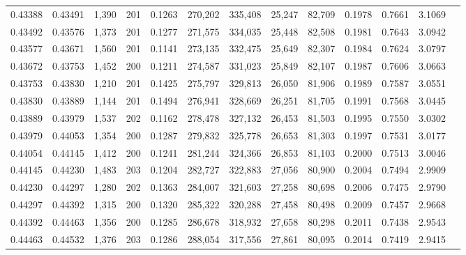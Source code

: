 \begin{tabular}{rrrrrrrrrrrrr}
0.43388 & 0.43491 & 1,390 & 201 &                                     0.1263 & 270,202 & 335,408 &  25,247 &  82,709 & 0.1978 & 0.7661 & 3.1069 \\
0.43492 & 0.43576 & 1,373 & 201 &                                     0.1277 & 271,575 & 334,035 &  25,448 &  82,508 & 0.1981 & 0.7643 & 3.0942 \\
0.43577 & 0.43671 & 1,560 & 201 &                                     0.1141 & 273,135 & 332,475 &  25,649 &  82,307 & 0.1984 & 0.7624 & 3.0797 \\
0.43672 & 0.43753 & 1,452 & 200 &                                     0.1211 & 274,587 & 331,023 &  25,849 &  82,107 & 0.1987 & 0.7606 & 3.0663 \\
0.43753 & 0.43830 & 1,210 & 201 &                                     0.1425 & 275,797 & 329,813 &  26,050 &  81,906 & 0.1989 & 0.7587 & 3.0551 \\
0.43830 & 0.43889 & 1,144 & 201 &                                     0.1494 & 276,941 & 328,669 &  26,251 &  81,705 & 0.1991 & 0.7568 & 3.0445 \\
0.43889 & 0.43979 & 1,537 & 202 &                                     0.1162 & 278,478 & 327,132 &  26,453 &  81,503 & 0.1995 & 0.7550 & 3.0302 \\
0.43979 & 0.44053 & 1,354 & 200 &                                     0.1287 & 279,832 & 325,778 &  26,653 &  81,303 & 0.1997 & 0.7531 & 3.0177 \\
0.44054 & 0.44145 & 1,412 & 200 &                                     0.1241 & 281,244 & 324,366 &  26,853 &  81,103 & 0.2000 & 0.7513 & 3.0046 \\
0.44145 & 0.44230 & 1,483 & 203 &                                     0.1204 & 282,727 & 322,883 &  27,056 &  80,900 & 0.2004 & 0.7494 & 2.9909 \\
0.44230 & 0.44297 & 1,280 & 202 &                                     0.1363 & 284,007 & 321,603 &  27,258 &  80,698 & 0.2006 & 0.7475 & 2.9790 \\
0.44297 & 0.44392 & 1,315 & 200 &                                     0.1320 & 285,322 & 320,288 &  27,458 &  80,498 & 0.2009 & 0.7457 & 2.9668 \\
0.44392 & 0.44463 & 1,356 & 200 &                                     0.1285 & 286,678 & 318,932 &  27,658 &  80,298 & 0.2011 & 0.7438 & 2.9543 \\
0.44463 & 0.44532 & 1,376 & 203 &                                     0.1286 & 288,054 & 317,556 &  27,861 &  80,095 & 0.2014 & 0.7419 & 2.9415 \\

\end{tabular}
